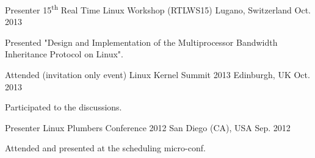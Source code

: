 \begin{cventries}
  \cventry
    {Presenter} %
    {15\textsuperscript{th} Real Time Linux Workshop (RTLWS15)} %
    {Lugano, Switzerland} %
    {Oct. 2013} %
    {
      \begin{cvitems} %
        \item {Presented "Design and Implementation of the Multiprocessor
		Bandwidth Inheritance Protocol on Linux".}
      \end{cvitems}
    }

  \cventry
    {Attended (invitation only event)} %
    {Linux Kernel Summit 2013} %
    {Edinburgh, UK} %
    {Oct. 2013} %
    {
      \begin{cvitems} %
        \item {Participated to the discussions.}
      \end{cvitems}
    }

  \cventry
    {Presenter} %
    {Linux Plumbers Conference 2012} %
    {San Diego (CA), USA} %
    {Sep. 2012} %
    {
      \begin{cvitems} %
        \item {Attended and presented at the scheduling micro-conf.}
      \end{cvitems}
    }


\end{cventries}

